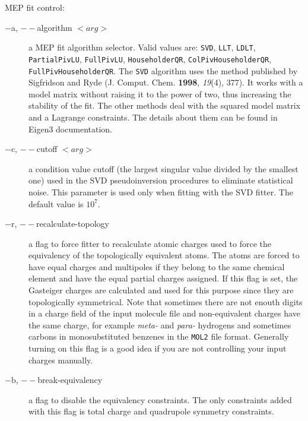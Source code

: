 \documentclass[10pt,a4paper]{article}
\begin{document}
MEP fit control:
\begin{description}
\item[$-$a, $--$algorithm $<arg>$] a MEP fit algorithm selector. Valid values are: 
\lstinline{SVD}, \lstinline{LLT}, \lstinline{LDLT}, \lstinline{PartialPivLU}, 
\lstinline{FullPivLU}, \lstinline{HouseholderQR}, \lstinline{ColPivHouseholderQR},
\lstinline{FullPivHouseholderQR}. 
The \lstinline{SVD} algorithm uses the method published by Sigfridson
and Ryde (J. Comput. Chem. \textbf{1998}, \textit{19}(4), 377). It works with a model
matrix without raising it to the power of two, thus increasing the stability of the fit. 
The other methods deal with the squared model matrix and a Lagrange constraints. The
details about them can be found in Eigen3 documentation.
\item[$-$c, $--$cutoff $<arg>$] a condition value cutoff (the largest singular value divided
by the smallest one) used in the SVD pseudoinversion procedures to eliminate statistical 
noise. This parameter is used only when fitting with the SVD fitter. The default value is 
$10^7$. 
\item[$-$r, $--$recalculate-topology] a flag to force fitter to recalculate atomic
charges used to force the equivalency of the topologically equivalent atoms. The atoms are
forced to have equal charges and multipoles if they belong to the same chemical element
and have the equal partial charges assigned. If this flag is set, the Gasteiger charges are
calculated and used for this purpose since they are topologically symmetrical. Note that
sometimes there are not enouth digits in a charge field of the input molecule file and
non-equivalent charges have the same charge, for example \textit{meta-} and \textit{para-} 
hydrogens and sometimes carbons in monosubstituted benzenes in the \lstinline{MOL2} file 
format. Generally turning on this
flag is a good idea if you are not controlling your input charges manually.
\item[$-$b, $--$break-equivalency] a flag to disable the equivalency constraints. The only
constraints added with this flag is total charge and quadrupole symmetry constraints.
\end{description}
\end{document}
